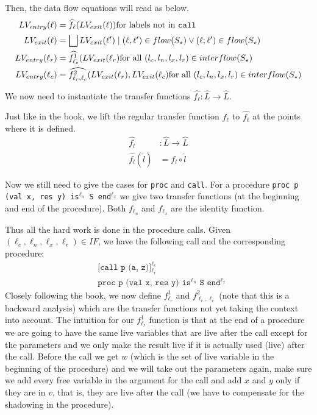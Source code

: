 \documentclass[a4wide,12pt]{article}
\theoremstyle{definition}
\theoremstyle{plain}
\theoremstyle{remark}
\begin{document}
Then, the data flow equations will read as below.
\begin{align*}
LV_{entry}(\ell) & = \widehat{f_\ell}(LV_{exit}(\ell)) \text{for labels not in \texttt{call}}\\
LV_{exit}(\ell) &= \bigsqcup{LV_{exit}(\ell') \mid (\ell,\ell') \in flow(S_\star) \lor (\ell;\ell') \in flow(S_\star)}\\
LV_{entry}(\ell_r) &= \widehat{f^1_{\ell_c}}(LV_{exit}(\ell_r) \text{for all $(l_c,l_n,l_x,l_r) \in interflow(S_\star)$}\\
LV_{entry}(\ell_c) &= \widehat{f^2_{\ell_r,\ell_c}}(LV_{exit}(\ell_r),LV_{exit}(\ell_c) \text{for all $(l_c,l_n,l_x,l_r) \in interflow(S_\star)$}\\
\end{align*}

We now need to instantiate the transfer functions $\widehat{f_\ell} : \hat{L} \to \hat{L}$.

Just like in the book, we lift the regular transfer function $f_\ell$ to $\widehat{f_\ell}$ at the points
where it is defined.
\begin{align*}
\widehat{f_l} & : \widehat{L} \to \widehat {L} \\
\widehat{f_l} (\widehat{l}) & = f_l \circ \widehat{l}
\end{align*}

Now we still need to give the cases for \texttt{proc} and \texttt{call}. For
a procedure
\texttt{proc p (val x, res y) is$^{\ell_n}$ S end$^{\ell_x}$}
we give two transfer functions (at the beginning and end of the procedure).
Both $f_{\ell_n}$ and $f_{\ell_x}$ are the identity function.

Thus all the hard work is
done in the procedure calls.
Given $(\ell_c, \ell_n, \ell_x, \ell_r) \in IF$, we have the following call and the corresponding
procedure:
\begin{align*}
& \texttt{[call p (a, z)]$^{\ell_c}_{\ell_r}$} \\
& \texttt{proc p (val x, res y) is$^{\ell_n}$ S end$^{\ell_x}$}
\end{align*}
Closely following the book, we now define $f^1_{\ell_r}$ and $f^2_{\ell_r,\ell_c}$ (note that
this is a backward analysis) which are the transfer functions not yet taking the context into account.  
The intuition for our $f^1_{\ell_r}$ function is that at the end of a procedure we are going
to have the same live variables that are live after the call except for the parameters and we only make the result
live if it is actually used (live) after the call. Before the call we get $w$ (which is the set of live variable 
in the beginning of the procedure) and we will
take out the parameters again, make sure we add every free variable in the
argument for the call and add $x$ and $y$ only if they are in $v$, that is, they are live after the call
(we have to compensate for the shadowing in the procedure).
 
\end{document}
